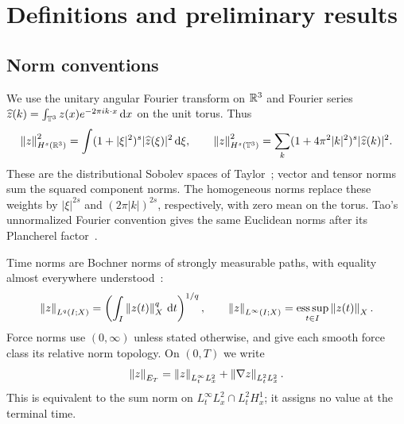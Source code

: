 \section{Definitions and preliminary results}\label{sec:preliminaries}
\subsection{Norm conventions}
We use the unitary angular Fourier transform on $\mathbb R^3$ and Fourier series
$\widehat z(k)=\int_{\mathbb T^3}z(x)e^{-2\pi i k\cdot x}\,\mathrm d x$ on the unit torus.
Thus
\[
 \left\lVert z\right\rVert_{H^s(\mathbb R^3)}^2=\int(1+|\xi|^2)^s|\widehat z(\xi)|^2\,\mathrm d\xi,
 \qquad
 \left\lVert z\right\rVert_{H^s(\mathbb T^3)}^2=\sum_k(1+4\pi^2|k|^2)^s|\widehat z(k)|^2.
\]
These are the distributional Sobolev spaces of
Taylor~\cite[Chapters~3--4]{taylor2011}; vector and tensor norms sum the
squared component norms. The homogeneous norms replace these weights by
$|\xi|^{2s}$ and $(2\pi|k|)^{2s}$, respectively, with zero mean on the
torus. Tao's unnormalized Fourier convention gives the same Euclidean norms
after its Plancherel factor~\cite[Appendix~A]{taodispersive}.

Time norms are Bochner norms of strongly measurable paths, with equality
almost everywhere understood~\cite[Definitions~6.14, 6.27]{hunterpde}:
\begin{equation}\label{eq:time-norms}
 \left\lVert z\right\rVert_{L^q(I;X)}=\left(\int_I\left\lVert z(t)\right\rVert_X^q\,\mathrm d t\right)^{1/q},
 \qquad \left\lVert z\right\rVert_{L^\infty(I;X)}=\operatorname*{ess\,sup}_{t\in I}\left\lVert z(t)\right\rVert_X.
\end{equation}
Force norms use $(0,\infty)$ unless stated otherwise, and give each smooth
force class its relative norm topology. On $(0,T)$ we write
\begin{equation}\label{eq:Enorm}
 \left\lVert z\right\rVert_{E_T}=\left\lVert z\right\rVert_{L^\infty_tL^2_x}+\left\lVert\nabla z\right\rVert_{L^2_tL^2_x}.
\end{equation}
This is equivalent to the sum norm on $L^\infty_tL^2_x\cap L^2_tH^1_x$;
it assigns no value at the terminal time.

